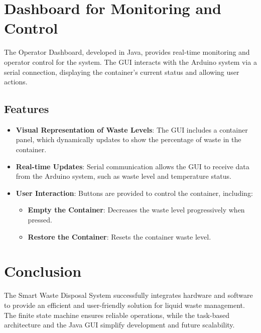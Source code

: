 \documentclass[a4paper]{article}
\begin{document}
	\section{Dashboard for Monitoring and Control}
	The Operator Dashboard, developed in Java, provides real-time monitoring and operator control for the system. The GUI interacts with the Arduino system via a serial connection, displaying the container's current status and allowing user actions.

	\subsection{Features}
	\begin{itemize}
		\item \textbf{Visual Representation of Waste Levels}: 
		The GUI includes a container panel, which dynamically updates to show the percentage of waste in the container.
		\item \textbf{Real-time Updates}: 
		Serial communication allows the GUI to receive data from the Arduino system, such as waste level and temperature status.
		\item \textbf{User Interaction}: 
		Buttons are provided to control the container, including:
		\begin{itemize}
			\item \textbf{Empty the Container}: Decreases the waste level progressively when pressed.
			\item \textbf{Restore the Container}: Resets the container waste level.
		\end{itemize}
	\end{itemize}

    \section{Conclusion}
    The Smart Waste Disposal System successfully integrates hardware and software to provide an efficient and user-friendly solution for liquid waste management. The finite state machine ensures reliable operations, while the task-based architecture and the Java GUI simplify development and future scalability.
\end{document}
